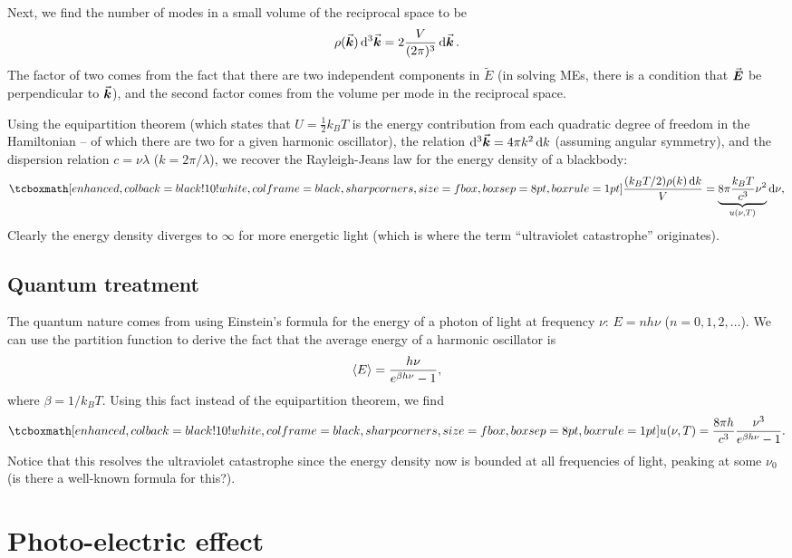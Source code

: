 Next, we find the number of modes in a small volume of the reciprocal space to be 
\begin{eqnarray}
    \rho(\va*{k}) \dd[3]{\va*{k}} = 2 \frac{V}{(2\pi)^3} \dd{\va*{k}}
.\end{eqnarray}
The factor of two comes from the fact that there are two independent components in $\tilde{E}$ (in solving MEs, there is a condition that $\va*{E}$ be perpendicular to $\va*{k}$), and the second factor comes from the volume per mode in the reciprocal space.

Using the equipartition theorem (which states that $U = \frac{1}{2} k_{B} T$ is the energy contribution from each quadratic degree of freedom in the Hamiltonian -- of which there are two for a given harmonic oscillator), the relation $\dd[3]{\va*{k}} = 4 \pi k^2 \dd{k}$ (assuming angular symmetry), and the dispersion relation $c = \nu \lambda$ ($k = 2\pi/\lambda$), we recover the Rayleigh-Jeans law for the energy density of a blackbody:
\begin{eqnarray}
    \eqbox{ \frac{(k_{B} T / 2 ) \rho(k) \dd{k}}{V} = \underbrace{ 8 \pi \frac{k_{B} T}{c^3} \nu^2 }_{u(\nu,T)} \dd{\nu} }
,\end{eqnarray}
Clearly the energy density diverges to $\infty$ for more energetic light (which is where the term ``ultraviolet catastrophe'' originates).

\subsection{Quantum treatment}

The quantum nature comes from using Einstein's formula for the energy of a photon of light at frequency $\nu$: $E = n h \nu$ ($n = 0,1,2,\ldots$).
We can use the partition function to derive the fact that the average energy of a harmonic oscillator is
\begin{eqnarray}
    \expval{E} = \frac{h \nu}{e^{\beta h \nu} - 1}
,\end{eqnarray}
where $\beta = 1/k_{B}T$.
Using this fact instead of the equipartition theorem, we find
\begin{eqnarray}
    \eqbox{ u(\nu,T) = \frac{8 \pi h}{c^3} \frac{\nu^3}{e^{\beta h \nu} - 1} }
.\end{eqnarray}
Notice that this resolves the ultraviolet catastrophe since the energy density now is bounded at all frequencies of light, peaking at some $\nu_0$ (is there a well-known formula for this?).


\section{Photo-electric effect}


